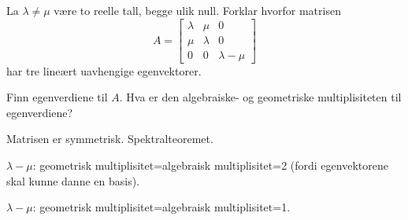 

\begin{oppgave}
\begin{punkt}
La $\lambda\neq \mu$ være to reelle tall, begge ulik null. Forklar hvorfor matrisen
$$A=
\begin{bmatrix}
\lambda & \mu & 0\\
\mu & \lambda & 0\\
0 & 0 & \lambda-\mu
\end{bmatrix}$$ har tre lineært uavhengige egenvektorer.
\end{punkt}
\begin{punkt}
Finn egenverdiene til $A$. Hva er den algebraiske- og geometriske multiplisiteten til egenverdiene?
\end{punkt}
\end{oppgave}

\begin{losning}


\begin{punkt}
Matrisen er symmetrisk. Spektralteoremet.
\end{punkt}

\begin{punkt}
$\lambda-\mu$: geometrisk multiplisitet=algebraisk multiplisitet=2 (fordi egenvektorene skal kunne danne en basis).

\noindent
$\lambda-\mu$: geometrisk multiplisitet=algebraisk multiplisitet=1.

\end{punkt}


\end{losning}
